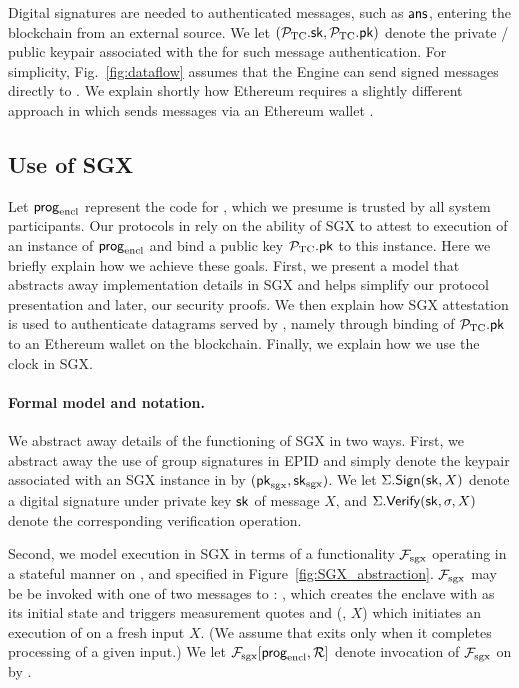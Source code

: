 Digital signatures are needed to authenticated messages, such as ${\sf ans}$, entering the blockchain from an external source. We let $({\mathcal{P}}_{\textrm{TC}}.{\sf sk}, {\mathcal{P}}_{\textrm{TC}}.{\sf pk})$ denote the private / public keypair associated with the \encname for such message authentication. For simplicity, Fig.~\ref{fig:dataflow} assumes that the Engine can send signed messages directly to \tcont. We explain shortly how Ethereum requires a slightly different approach in which \tc sends messages via an Ethereum wallet \tcadd.


\subsection{Use of SGX}

Let ${\sf prog}_{\textrm{encl}}$ represent the code for \encname, which we presume is trusted by all system participants. Our protocols in \tc rely on the ability of SGX to attest to execution of an instance of ${\sf prog}_{\textrm{encl}}$ and bind a public key ${\mathcal{P}}_{\textrm{TC}}.{\sf pk}$ to this instance. Here we briefly explain how we achieve these goals. First, we present a model that abstracts away implementation details in SGX and helps simplify our protocol presentation and later, our security proofs.  We then explain how SGX attestation is used to authenticate datagrams served by \tcont, namely through binding of ${\mathcal{P}}_{\textrm{TC}}.{\sf pk}$ to an Ethereum wallet on the blockchain. Finally, we explain how we use the clock in SGX.



\paragraph{\bf Formal model and notation.} 

We abstract away details of the functioning of SGX in two ways.
First, we abstract away the use of group signatures in EPID and simply denote the keypair associated with an SGX instance in \tc by $({\sf pk}_{\mathrm{sgx}}, {\sf sk}_{\mathrm{sgx}})$. We let $\Sigma.{\sf Sign}({{\sf sk}}, X)$ denote a digital signature under private key ${\sf sk}$ of message $X$, and $\Sigma.{\sf Verify}({{\sf sk}}, \sigma, X)$ denote the corresponding verification operation. 

Second, we model execution in SGX in terms of a functionality $\mathcal{F}_{\textrm{sgx}}$ operating in a stateful manner on \enclaveprog, and specified in Figure~\ref{fig:SGX_abstraction}. $\mathcal{F}_{\textrm{sgx}}$ may be be invoked with one of two messages to \enclaveprog: \initcall, which creates the enclave with \enclaveprog as its initial state and triggers measurement quotes and (\resumecall, $X$) which initiates an execution of \enclaveprog on a fresh input $X$. (We assume that \enclaveprog exits only when it completes processing of a given input.) We let $\mathcal{F}_{\textrm{sgx}}[{\sf prog}_{\textrm{encl}}, \mathcal{R}]$ denote invocation of $\mathcal{F}_{\textrm{sgx}}$ on \enclaveprog by \relay. 


